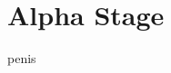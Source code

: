 
\section{Alpha Stage}

penis

\begin{comment}
features wanted at this stage:
    - server client
    - more focus around infrastructure than features
    

\end{comment}
